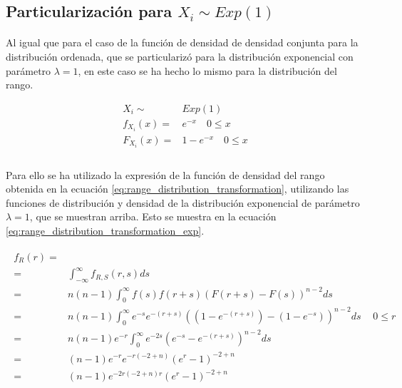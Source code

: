 \documentclass{article}
\begin{document}
    \subsection{Particularización para $X_i \sim Exp(1)$}

      \paragraph{}
      Al igual que para el caso de la función de densidad de densidad conjunta para la distribución ordenada, que se particularizó para la distribución exponencial con parámetro $\lambda = 1$, en este caso se ha hecho lo mismo para la distribución del rango.

      \begin{align*}
        X_i \sim& Exp(1)\\
        f_{X_{i}}(x) =& e^{-x}  \quad 0 \leq x \\
        F_{X_{i}}(x) =& 1-e^{-x} \quad 0 \leq x \\
      \end{align*}

      \paragraph{}
      Para ello se ha utilizado la expresión de la función de densidad del rango obtenida en la ecuación \eqref{eq:range_distribution_transformation}, utilizando las funciones de distribución y densidad de la distribución exponencial de parámetro $\lambda = 1$, que se muestran arriba. Esto se muestra en la ecuación \eqref{eq:range_distribution_transformation_exp}.

      \begin{align}
      \label{eq:range_distribution_transformation_exp}
        \begin{split}
          f_{R} (r) =&\\
          =& \int_{-\infty}^{\infty} f_{R,S}(r,s) ds \\
          =& n(n-1)\int_{0}^{\infty} f(s)f(r+s)(F(r+s) - F(s))^{n-2} ds \\
          =& n(n-1)\int_{0}^{\infty} e^{-s}e^{-(r+s)}((1-e^{-(r+s)}) - (1-e^{-s}))^{n-2} ds \\
          =& n(n-1)e^{-r}\int_{0}^{\infty} e^{-2s}( e^{-s} - e^{-(r+s)})^{n-2} ds \\
          =& (n-1)e^{-r}e^{-r(-2 + n)} (e^r -1)^{-2 + n} \\
          =& (n-1)e^{-2r(-2 + n) r} (e^r -1)^{-2 + n}
        \end{split} & 0 \leq r
      \end{align}
\end{document}
